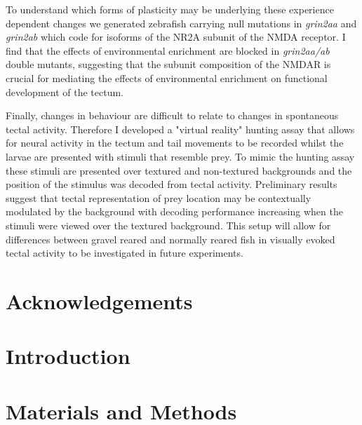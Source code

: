 \documentclass[a4paper,12pt,oneside]{report}
\begin{document}
    To understand which forms of plasticity may be underlying these experience dependent changes we generated zebrafish carrying null mutations in \textit{grin2aa} and \textit{grin2ab} which code for isoforms of the NR2A subunit of the NMDA receptor. I find that the effects of environmental enrichment are blocked in \textit{grin2aa/ab} double mutants, suggesting that the subunit composition of the NMDAR is crucial for mediating the effects of environmental enrichment on functional development of the tectum. 
    
    Finally, changes in behaviour are difficult to relate to changes in spontaneous tectal activity. Therefore I developed a "virtual reality" hunting assay that allows for neural activity in the tectum and tail movements to be recorded whilst the larvae are presented with stimuli that resemble prey. To mimic the hunting assay these stimuli are presented over textured and non-textured backgrounds and the position of the stimulus was decoded from tectal activity. Preliminary results suggest that tectal representation of prey location may be contextually modulated by the background with decoding performance increasing when the stimuli were viewed over the textured background. This setup will allow for differences between gravel reared and normally reared fish in visually evoked tectal activity to be investigated in future experiments.
  
      
      
    \clearpage
    \chapter*{Acknowledgements}
    
    
    \clearpage
    \tableofcontents
    \clearpage
    \listoffigures
    
    
    \clearpage
    
    \printglossary[type=\acronymtype,title=Abbreviations,nonumberlist]
    
    \chapter{Introduction}
    

   
   \chapter{Materials and Methods}
   
    
\end{document}
